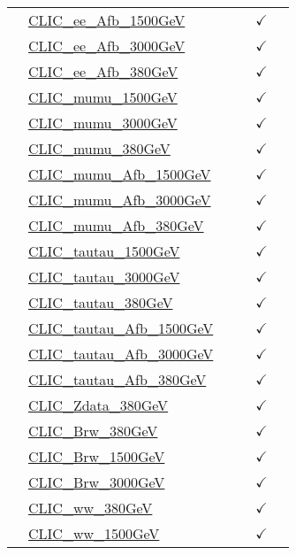 \documentclass{article}
\begin{document}
\begin{longtable}{|c|l|c|c|c|c|}
 & \href{https://arxiv.org}{CLIC_ee_Afb_1500GeV}  &  &  & $\checkmark$ & \\ \cline{2-6}
 & \href{https://arxiv.org}{CLIC_ee_Afb_3000GeV}  &  &  & $\checkmark$ & \\ \cline{2-6}
 & \href{https://arxiv.org}{CLIC_ee_Afb_380GeV}  &  &  & $\checkmark$ & \\ \cline{2-6}
 & \href{https://arxiv.org}{CLIC_mumu_1500GeV}  &  &  & $\checkmark$ & \\ \cline{2-6}
 & \href{https://arxiv.org}{CLIC_mumu_3000GeV}  &  &  & $\checkmark$ & \\ \cline{2-6}
 & \href{https://arxiv.org}{CLIC_mumu_380GeV}  &  &  & $\checkmark$ & \\ \cline{2-6}
 & \href{https://arxiv.org}{CLIC_mumu_Afb_1500GeV}  &  &  & $\checkmark$ & \\ \cline{2-6}
 & \href{https://arxiv.org}{CLIC_mumu_Afb_3000GeV}  &  &  & $\checkmark$ & \\ \cline{2-6}
 & \href{https://arxiv.org}{CLIC_mumu_Afb_380GeV}  &  &  & $\checkmark$ & \\ \cline{2-6}
 & \href{https://arxiv.org}{CLIC_tautau_1500GeV}  &  &  & $\checkmark$ & \\ \cline{2-6}
 & \href{https://arxiv.org}{CLIC_tautau_3000GeV}  &  &  & $\checkmark$ & \\ \cline{2-6}
 & \href{https://arxiv.org}{CLIC_tautau_380GeV}  &  &  & $\checkmark$ & \\ \cline{2-6}
 & \href{https://arxiv.org}{CLIC_tautau_Afb_1500GeV}  &  &  & $\checkmark$ & \\ \cline{2-6}
 & \href{https://arxiv.org}{CLIC_tautau_Afb_3000GeV}  &  &  & $\checkmark$ & \\ \cline{2-6}
 & \href{https://arxiv.org}{CLIC_tautau_Afb_380GeV}  &  &  & $\checkmark$ & \\ \cline{2-6}
 & \href{https://arxiv.org}{CLIC_Zdata_380GeV}  &  &  & $\checkmark$ & \\ \cline{2-6}
 & \href{https://arxiv.org}{CLIC_Brw_380GeV}  &  &  & $\checkmark$ & \\ \cline{2-6}
 & \href{https://arxiv.org}{CLIC_Brw_1500GeV}  &  &  & $\checkmark$ & \\ \cline{2-6}
 & \href{https://arxiv.org}{CLIC_Brw_3000GeV}  &  &  & $\checkmark$ & \\ \cline{2-6}
 & \href{https://arxiv.org}{CLIC_ww_380GeV}  &  &  & $\checkmark$ & \\ \cline{2-6}
 & \href{https://arxiv.org}{CLIC_ww_1500GeV}  &  &  & $\checkmark$ & \\ \cline{2-6}

\end{longtable}
\end{document}
